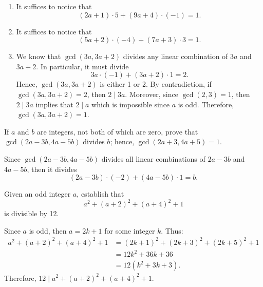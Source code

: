 \begin{solution}
    \begin{enumerate}
        \item It suffices to notice that
        $$(2a+1)\cdot 5 + (9a + 4)\cdot (-1) = 1.$$
        \item It suffices to notice that
        $$(5a+2)\cdot (-4) + (7a + 3)\cdot 3 = 1.$$
        \item We know that $\gcd(3a, 3a+2)$ divides any linear combination of $3a$ and $3a+2$. In particular, it must divide
        $$3a \cdot (-1) + (3a+2) \cdot 1 = 2.$$
        Hence, $\gcd(3a, 3a+2)$ is either 1 or 2. By contradiction, if $\gcd(3a, 3a+2) = 2$, then $2 \mid 3a$. Moreover, since $\gcd(2,3) = 1$, then $2 \mid 3a$ implies that $2 \mid a$ which is impossible since $a$ is odd. Therefore, $\gcd(3a, 3a+2) = 1$.
    \end{enumerate}
\end{solution}

\begin{exercise}
    If $a$ and $b$ are integers, not both of which are zero, prove that $\gcd(2a - 3b, 4a - 5b)$ divides $b$; hence, $\gcd(2a+3, 4a+5) = 1$. \\
\end{exercise}

\begin{solution}
    Since $\gcd(2a - 3b, 4a - 5b)$ divides all linear combinations of $2a - 3b$ and $4a - 5b$, then it divides 
    $$(2a - 3b)\cdot (-2) + (4a - 5b)\cdot 1 = b.$$
\end{solution}

\begin{exercise}
    Given an odd integer $a$, establish that
    $$a^2 + (a+2)^2 + (a+4)^2 + 1$$
    is divisible by 12. \\
\end{exercise}

\begin{solution}
    Since $a$ is odd, then $a = 2k+1$ for some integer $k$. Thus:
    \begin{align*}
        a^2 + (a+ 2)^2 + (a+4)^2 + 1 &= (2k+1)^2 + (2k+3)^2 + (2k+5)^2 + 1 \\
        &= 12k^2 + 36k + 36 \\
        &= 12(k^2 + 3k + 3).
    \end{align*}
    Therefore, $12 \mid a^2 + (a+2)^2 + (a+4)^2 + 1$.\\
\end{solution}

